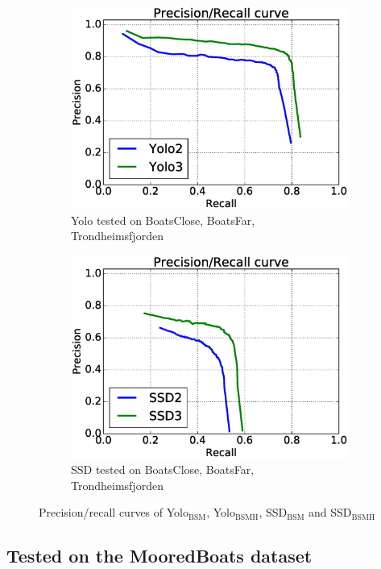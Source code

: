 \begin{figure}[h!]
\begin{subfigure}{.5\textwidth}
  \centering
  \includegraphics[width=0.8\linewidth]{results/case_buildings/prec_recall/yolo/bcbftrf.eps}
  \caption{Yolo tested on BoatsClose, BoatsFar, Trondheimsfjorden}
  \label{fig:sfig1}
\end{subfigure}%
\begin{subfigure}{.5\textwidth}
  \centering
  \includegraphics[width=.8\linewidth]{results/case_buildings/prec_recall/ssd/bcbftrf.eps}
  \caption{SSD tested on BoatsClose, BoatsFar, Trondheimsfjorden}
  \label{fig:sfig2}
\end{subfigure}
\caption{Precision/recall curves of Yolo$_{\text{BSM}}$, Yolo$_{\text{BSMH}}$, SSD$_{\text{BSM}}$ and SSD$_{\text{BSMH}}$}
\label{fig:case_build}
\end{figure}

\newpage


\subsection{Tested on the MooredBoats dataset}

